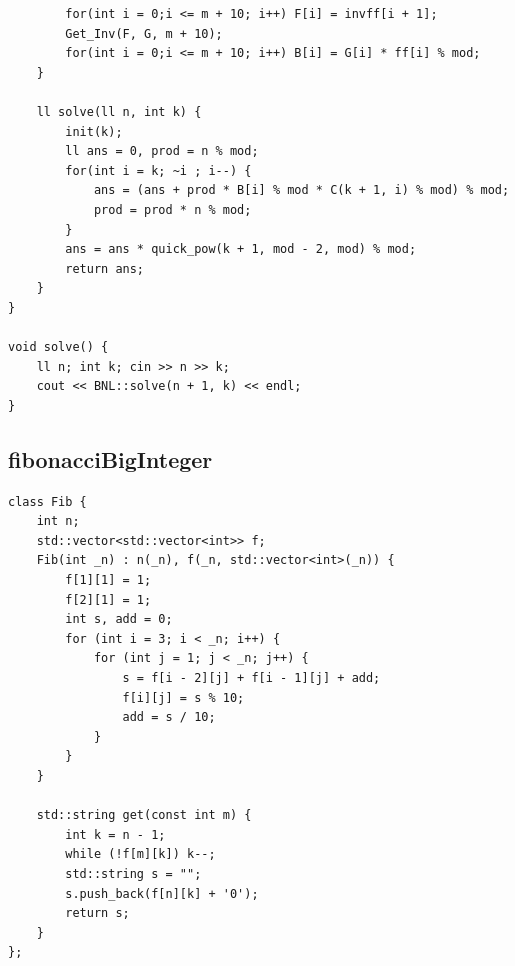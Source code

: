 \documentclass[twoside]{article}
\begin{document}
\begin{lstlisting}
        for(int i = 0;i <= m + 10; i++) F[i] = invff[i + 1];
        Get_Inv(F, G, m + 10);
        for(int i = 0;i <= m + 10; i++) B[i] = G[i] * ff[i] % mod;
    }

    ll solve(ll n, int k) {
        init(k);
        ll ans = 0, prod = n % mod;
        for(int i = k; ~i ; i--) {
            ans = (ans + prod * B[i] % mod * C(k + 1, i) % mod) % mod;
            prod = prod * n % mod;
        }
        ans = ans * quick_pow(k + 1, mod - 2, mod) % mod;
        return ans;
    }
}

void solve() {
    ll n; int k; cin >> n >> k;
    cout << BNL::solve(n + 1, k) << endl;
}\end{lstlisting}
\subsection{fibonacciBigInteger}
\begin{lstlisting}
class Fib {
    int n;
    std::vector<std::vector<int>> f;
    Fib(int _n) : n(_n), f(_n, std::vector<int>(_n)) {
        f[1][1] = 1;
        f[2][1] = 1;
        int s, add = 0;
        for (int i = 3; i < _n; i++) {
            for (int j = 1; j < _n; j++) {
                s = f[i - 2][j] + f[i - 1][j] + add;
                f[i][j] = s % 10;
                add = s / 10;
            }
        }
    }

    std::string get(const int m) {
        int k = n - 1;
        while (!f[m][k]) k--;
        std::string s = "";
        s.push_back(f[n][k] + '0');
        return s;
    }
};\end{lstlisting}
\end{document}
